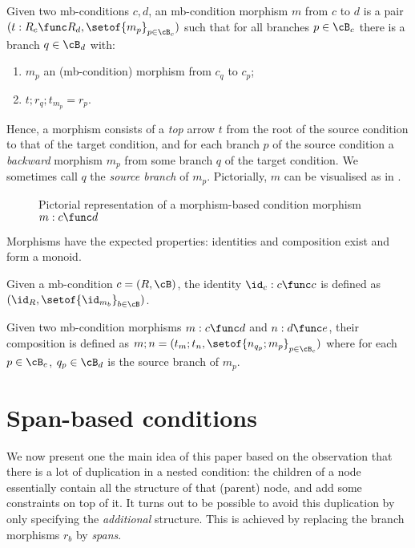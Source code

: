 \begin{definition}
  Given two mb-conditions $c,d$, an mb-condition morphism $m$ from $c$ to $d$ is a pair $(t:R_c\func R_d,\setof{m_p}_{p\in \cB_c})$ such that for all branches $p\in \cB_c$ there is a branch $q\in \cB_d$ with:
  \begin{enumerate}
  \item $m_p$ an (mb-condition) morphism from $c_q$ to $c_p$;
  \item $t;r_q;t_{m_p}=r_p$.
  \end{enumerate}
\end{definition}
%
Hence, a morphism consists of a \emph{top} arrow $t$ from the root of the source condition to that of the target condition, and for each branch $p$ of the source condition a \emph{backward} morphism $m_p$ from some branch $q$ of the target condition. We sometimes call $q$ the \emph{source branch} of $m_p$. Pictorially, $m$ can be visualised as in .
%
\begin{figure}
  \centering
  
  \caption{Pictorial representation of a morphism-based condition morphism $m:c\func d$}
\end{figure}

\medskip\noindent Morphisms have the expected properties: identities and composition exist and form a monoid.
%
\begin{definition}
  Given a mb-condition $c=(R,\cB)$, the identity $\id_c:c\func c$ is defined as $(\id_R,\setof{\id_{m_b}}_{b\in \cB})$.
\end{definition}

\begin{definition}
Given two mb-condition morphisms $m:c\func d$ and $n:d\func e$, their composition is defined as $m;n=(t_m;t_n,\setof{n_{q_p};m_p}_{p\in \cB_c})$ where for each $p\in \cB_c$, $q_p\in \cB_d$ is the source branch of $m_p$.
\end{definition}

\section{Span-based conditions}

We now present one the main idea of this paper based on the observation that there is a lot of duplication in a nested condition: the children of a node essentially contain all the structure of that (parent) node, and add some constraints on top of it. It turns out to be possible to avoid this duplication by only specifying the \emph{additional} structure. This is achieved by replacing the branch morphisms $r_b$ by \emph{spans}.


